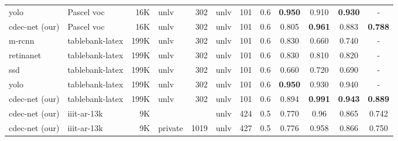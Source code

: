 \documentclass[a4paper,conference]{IEEEtran}
\begin{document}
\begin{table*}
\begin{center}
\begin{tabular}{|l| l | r|l |r|l|r| c| c c c c|}
{\sc yolo}~\cite{casado2019benefits} &Pascel {\sc voc} &16K &{\sc unlv} &302 &{\sc unlv} &101 &0.6 &\textbf{0.950} &0.910 &\textbf{0.930} &- \\
{\sc cd}e{\sc c-n}et (our) &Pascel {\sc voc} &16K &{\sc unlv} &302 &{\sc unlv} &101 &0.6 &0.805 &\textbf{0.961} &0.883 &\textbf{0.788} \\ 
\hhline{|=|=|=|=|=|=|=|=|====|}
{\sc m-rcnn}~\cite{casado2019benefits} &{\sc t}able{\sc b}ank-{\sc l}a{\sc t}e{\sc x} &199K &{\sc unlv} &302 &{\sc unlv} &101 &0.6 &0.830 &0.660 &0.740 &- \\
{\sc r}etina{\sc n}et~\cite{casado2019benefits} &{\sc t}able{\sc b}ank-{\sc l}a{\sc t}e{\sc x} &199K &{\sc unlv} &302 &{\sc unlv} &101 &0.6 &0.830 &0.810 &0.820 &- \\
{\sc ssd}~\cite{casado2019benefits} &{\sc t}able{\sc b}ank-{\sc l}a{\sc t}e{\sc x} &199K &{\sc unlv} &302 &{\sc unlv} &101 &0.6 &0.660 &0.720 &0.690 &- \\
{\sc yolo}~\cite{casado2019benefits} &{\sc t}able{\sc b}ank-{\sc l}a{\sc t}e{\sc x} &199K &{\sc unlv} &302 &{\sc unlv} &101 &0.6 &\textbf{0.950} &0.930 &0.940 &- \\
{\sc cd}e{\sc c-n}et (our) &{\sc t}able{\sc b}ank-{\sc l}a{\sc t}e{\sc x} &199K &{\sc unlv} &302 &{\sc unlv} &101 &0.6 &0.894 &\textbf{0.991} &\textbf{0.943} &\textbf{0.889} \\
\hhline{|=|=|=|=|=|=|=|=|====|}  
{\sc cd}e{\sc c-n}et (our) &{\sc iiit-ar-13k} &9K & &  &{\sc unlv} &424 &0.5 &0.770 &0.96 &0.865 &0.742 \\ 
{\sc cd}e{\sc c-n}et (our) &{\sc iiit-ar-13k} &9K &private &1019  &{\sc unlv} &427 &0.5 & 0.776 & 0.958 & 0.866 & 0.750 \\ \hline
\end{tabular}
\end{center}
\caption{Illustrates comparison between the proposed {\sc cd}e{\sc c-n}et and state-of-the-art techniques on {\sc unlv} dataset. {\sc \textbf{d4:}} indicates {\sc icdar-2013}+{\sc icdar-2017}+Marmot. {\sc cd}e{\sc c-n}et\textbf{:} indicates a single  model which is trained with {\sc iiit-ar-13k} dataset. \label{table_unlv}}
\end{table*}
\end{document}

